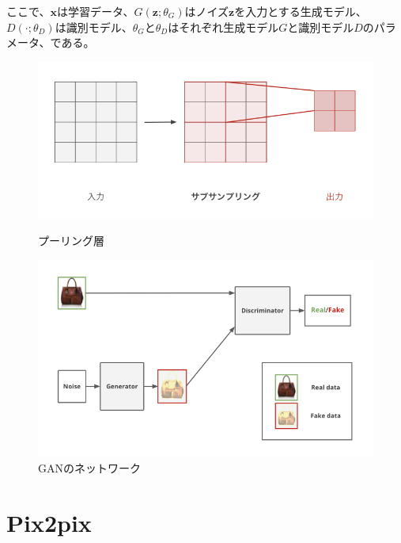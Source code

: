 ここで、$\boldsymbol{x}$は学習データ、$G(\boldsymbol{z};\theta_G)$はノイズ$\boldsymbol{z}$を入力とする生成モデル、$D(\cdot;\theta_D)$は識別モデル、$\theta_G$と$\theta_D$はそれぞれ生成モデル$G$と識別モデル$D$のパラメータ、である。

\begin{figure}[b]
\centering
\begin{minipage}[b]{0.48\columnwidth}
\centering
\includegraphics[width=\columnwidth]{figure/pooling.png}
\caption[CNNのプーリング層]{プーリング層}
\label{fig:pooling}
\end{minipage}
\begin{minipage}[b]{0.48\columnwidth}
\centering
\includegraphics[width=\columnwidth]{figure/GAN_net.png}
\caption[GANのネットワーク]{GANのネットワーク}
\label{fig:GAN_net}
\end{minipage}
\end{figure}

\clearpage

\section{Pix2pix}

